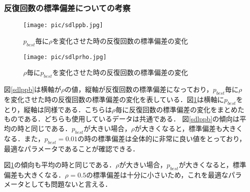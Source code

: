\documentclass[a4j]{jsarticle}
\begin{document}
\subsubsection{反復回数の標準偏差についての考察}
\begin{figure}[htb]
 \begin{minipage}{0.5\hsize}
  \begin{center}
   \texttt{[image: pic/sdlppb.jpg]}
  \end{center}
  \caption{$p_{best}$毎に$\rho$を変化させた時の反復回数の標準偏差の変化}
  \label{sdlppb}
 \end{minipage}
 \begin{minipage}{0.5\hsize}
  \begin{center}
   \texttt{[image: pic/sdlprho.jpg]}
  \end{center}
  \caption{$\rho$毎に$p_{best}$を変化させた時の反復回数の標準偏差の変化}
  \label{sdlprho}
 \end{minipage}
\end{figure}

図\ref{sdlppb}は横軸が$\rho$の値，縦軸が反復回数の標準偏差になっており，$p_{best}$毎に$\rho$を変化させた時の反復回数の標準偏差の変化を表している．図\ref{sdlprho}は横軸に$p_{best}$をとり，縦軸は同様である．こちらは$\rho$毎に反復回数の標準偏差の変化をまとめたものである．どちらも使用しているデータは共通である．
図\ref{sdlppb}の傾向は平均の時と同じである．$p_{best}$が大きい場合，$\rho$が大きくなると，標準偏差も大きくなる．また，$p_{best} = 0.01$の時の標準偏差は全体的に非常に良い値をとっており，最適なパラメータであることが確認できる．
\par
図\ref{sdlprho}の傾向も平均の時と同じである．$\rho$が大きい場合，$p_{best}$が大きくなると，標準偏差も大きくなる．$\rho=0.5$の標準偏差は十分に小さいため，これを最適なパラメータとしても問題ないと言える．
\end{document}

